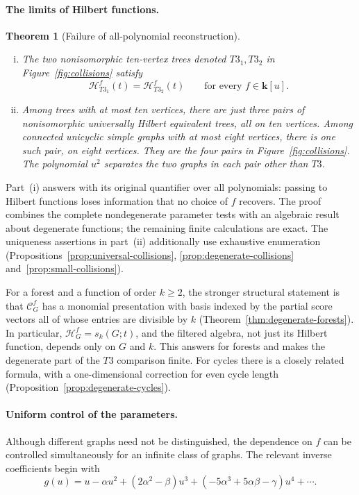 \documentclass[reqno]{article}
\theoremstyle{plain} %
\newtheorem{mainthm}{Theorem}
\theoremstyle{definition}
\theoremstyle{remark}
\newcommand{\K} {\mathbf{k}}
\newcommand {\CC}{\mathscr{C}}
\newcommand{\hs}{\mathscr{H}}
\numberwithin{equation}{section}
\begin{document}
\paragraph{The limits of Hilbert functions.}
\begin{mainthm}[Failure of all-polynomial reconstruction]\label{thmA}
\leavevmode
\begin{enumerate}[(i)]
\item The two nonisomorphic ten-vertex trees denoted $T3_1,T3_2$ in
Figure~\ref{fig:collisions} satisfy
\[
 \hs_{T3_1}^f(t)=\hs_{T3_2}^f(t)\qquad\text{for every }f\in\K[u].
\]
\item Among trees with at most ten vertices, there are just three
pairs of nonisomorphic universally Hilbert equivalent trees, all on ten
vertices. Among connected unicyclic simple graphs with at most eight
vertices, there is one such pair, on eight vertices. They are
the four pairs in Figure~\ref{fig:collisions}. The polynomial $u^2$
separates the two graphs in each pair other than $T3$.
\end{enumerate}
\end{mainthm}

Part~(i) answers \cite[Problem~5]{NSh} with its original quantifier over
all polynomials: passing to Hilbert functions loses information that no
choice of $f$ recovers. The proof combines the complete nondegenerate
parameter tests with an algebraic result about degenerate functions;
the remaining finite calculations are exact. The uniqueness assertions
in part~(ii) additionally use exhaustive enumeration
(Propositions~\ref{prop:universal-collisions},
\ref{prop:degenerate-collisions} and~\ref{prop:small-collisions}).

For a forest and a function of order $k\ge2$, the stronger structural
statement is that $\CC_G^f$ has a monomial presentation with basis
indexed by the partial score vectors all of whose entries are divisible
by $k$ (Theorem~\ref{thm:degenerate-forests}). In particular,
$\hs_G^f=s_k(G;t)$, and the filtered algebra, not just its Hilbert
function, depends only on $G$ and $k$. This answers
\cite[Problem~4]{NSh} for forests and makes the degenerate part of the
$T3$ comparison finite. For cycles there is a closely related formula,
with a one-dimensional correction for even cycle length
(Proposition~\ref{prop:degenerate-cycles}).

\paragraph{Uniform control of the parameters.}
Although different graphs need not be distinguished, the dependence on
$f$ can be controlled simultaneously for an infinite class of graphs.
The relevant inverse coefficients begin with
\begin{equation}\label{eq:intro-inverse}
 g(u)=u-\alpha u^2+(2\alpha^2-\beta)u^3
       +(-5\alpha^3+5\alpha\beta-\gamma)u^4+\cdots.
\end{equation}
\end{document}
